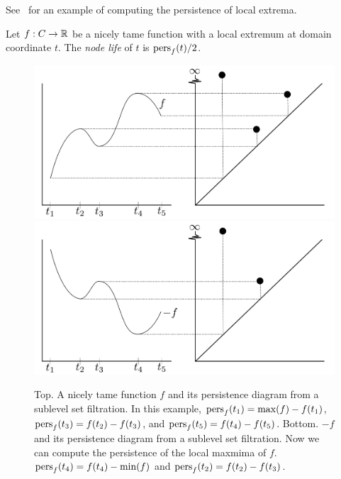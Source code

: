 See~ for an example of computing the persistence of local extrema.

\begin{defn}\label{def:nodelife}
    Let $f:C \rightarrow \mathbb{R}$ be a nicely tame function with a local extremum at domain coordinate $t$. The \emph{node life} of $t$ is $\text{pers}_f(t)/2$.
\end{defn}

\begin{figure}[htp]
    \centering
    {\includegraphics[width=.7\textwidth]{images/nodelife}}
   {\includegraphics[width=.7\textwidth]{images/nodelife-max}}
    \caption{Top. A nicely tame function $f$ and its persistence diagram from a sublevel set filtration.
In this example, $\text{pers}_f(t_1) = \max(f)-f(t_1)$, $\text{pers}_f(t_3)=f(t_2)-f(t_3)$, and $\text{pers}_f(t_5)=f(t_4)-f(t_5)$.
Bottom. $-f$ and its persistence diagram from a sublevel set filtration. Now we can compute the persistence of the local maxmima of $f$.
$\text{pers}_f(t_4) = f(t_4)-\min(f)$ and $\text{pers}_f(t_2)=f(t_2)-f(t_3)$.}
    \label{fig:nodelife}
\end{figure}



